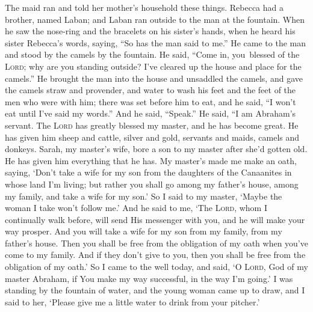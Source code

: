 \begin{inparaenum}
   The maid ran and told her mother's household these things.%
   Rebecca had a brother, named Laban; and Laban ran outside to the man at the fountain.%
   When he saw the nose-ring and the bracelets on his sister's hands, when he heard his sister Rebecca's words, saying, ``So has the man said to me.'' He came to the man and stood by the camels by the fountain.%
   He said, ``Come in, you\understood\ blessed of the \textsc{Lord}; why are you standing outside? I've cleared up the house and place for the camels.''%
   He brought the man into the house and unsaddled the camels, and gave the camels straw and provender, and water to wash his feet and the feet of the men who were with him;%
   there was set before him to eat, and he said, ``I won't eat until I've said my words.'' And he said, ``Speak.''%
   He said, ``I am Abraham's servant.%
   The \textsc{Lord} has greatly blessed my master, and he has become great. He has given him sheep and cattle, silver and gold, servants and maids, camels and donkeys.%
   Sarah, my master's wife, bore a son to my master after she'd gotten old. He has given him everything that he has.%
   My master's made me make an oath, saying, `Don't take a wife for my son from the daughters of the Canaanites in whose land I'm living;%
   but rather you shall go among my father's house, among my family, and take a wife for my son.'%
   So I said to my master, `Maybe the woman I take won't follow me.'%
   And he said to me, `The \textsc{Lord}, whom I continually walk before, will send His messenger with you, and he will make your way prosper. And you will take a wife for my son from my family, from my father's house.%
   Then you shall be free from the obligation of my oath when you've come to my family. And if they don't give to you, then you shall be free from the obligation of my oath.'%
   So I came to the well today, and said, `O \textsc{Lord}, God of my master Abraham, if You make my way successful, in the way I'm going.'%
   I was standing by the fountain of water, and the young woman came up to draw, and I said to her, `Please give me a little water to drink from your pitcher.'%

\end{inparaenum}
